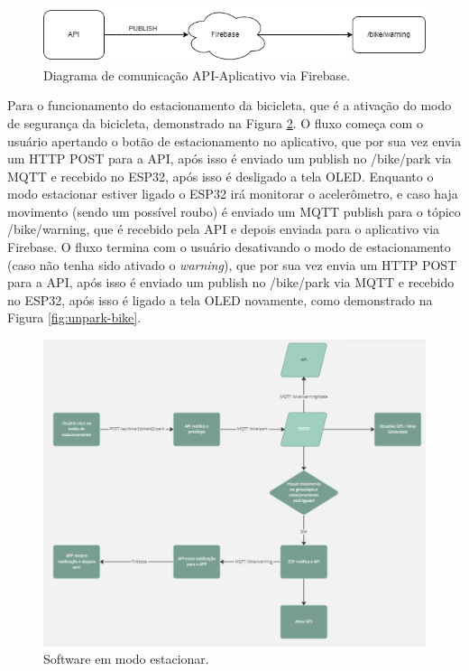 \begin{figure}[!h]
\centering
\includegraphics[width=15cm]{capitulos/Figuras/api-firebase.png}
\caption{Diagrama de comunicação API-Aplicativo via Firebase.}
\label{fig:api_app_http}
\end{figure}

Para o funcionamento do estacionamento da bicicleta, que é a ativação do modo de segurança da bicicleta, demonstrado na Figura \ref{fig:park-bike}. O fluxo começa com o usuário apertando o botão de estacionamento no aplicativo, que por sua vez envia um HTTP POST para a API, após isso é enviado um publish no /bike/park via MQTT e recebido no ESP32, após isso é desligado a tela OLED. Enquanto o modo estacionar estiver ligado o ESP32 irá monitorar o acelerômetro, e caso haja movimento (sendo um possível roubo) é enviado um MQTT publish para o tópico /bike/warning, que é recebido pela API e depois enviada para o aplicativo via Firebase. O fluxo termina com o usuário desativando o modo de estacionamento (caso não tenha sido ativado o \textit{warning}), que por sua vez envia um HTTP POST para a API, após isso é enviado um publish no /bike/park via MQTT e recebido no ESP32, após isso é ligado a tela OLED novamente, como demonstrado na Figura \ref{fig:unpark-bike}.

\begin{figure}[!h]
\centering
\includegraphics[width=15cm]{capitulos/Figuras/Software_Estacionar.png}
\caption{Software em modo estacionar.}
\label{fig:park-bike}
\end{figure}

